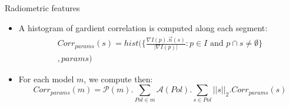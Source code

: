 \documentclass{beamer}
\begin{document}
            \begin{frame}{Radiometric features}
                \begin{itemize}[label=$\blacktriangleright$, font=\color{IGNGreen}]
                    \item<1-> A histogram of gardient correlation is computed along each segment:
                    \begin{multline}
                        Corr_{params}(s) = hist \Bigg( \Big\{\frac{\nabla I(p) . \vec{n}(s)}{\vert\nabla I(p)\vert}: p \in I \text{ and } p \cap s \neq \emptyset \Big\}\\
                        , params\Bigg)
                    \end{multline}
                    \item<2-> For each model $m$, we compute then:
                    \begin{equation}
                        Corr_{params}(m) = \mathscr{P}(m) . \sum_{Pol \in m} \mathscr{A}(Pol). \sum_{s \in Pol} \vert\vert s \vert\vert_2. Corr_{params}(s)
                    \end{equation}
                \end{itemize}
            \end{frame}
\end{document}
